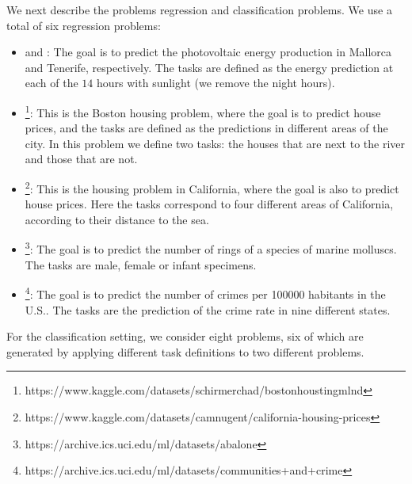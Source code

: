 We next describe the problems regression and classification problems.
We use a total of six regression problems:
\begin{itemize}
    \item {} and : The goal is to predict the photovoltaic energy production in Mallorca and Tenerife, respectively. The tasks are defined as the energy prediction at each of the $14$ hours with sunlight (we remove the night hours).
    \item {}\footnote{https://www.kaggle.com/datasets/schirmerchad/bostonhoustingmlnd}: This is the Boston housing problem, where the goal is to predict house prices, and the tasks are defined as the predictions in different areas of the city. In this problem we define two tasks: the houses that are next to the river and those that are not. 
    \item {}\footnote{https://www.kaggle.com/datasets/camnugent/california-housing-prices}: This is the housing problem in California, where the goal is also to predict house prices. Here the tasks correspond to four different areas of California, according to their distance to the sea.
    \item {}\footnote{https://archive.ics.uci.edu/ml/datasets/abalone}: The goal is to predict the number of rings of a species of marine molluscs. The tasks are male, female or infant specimens.
    \item {}\footnote{https://archive.ics.uci.edu/ml/datasets/communities+and+crime}: The goal is to predict the number of crimes per \num{100000} habitants in the U.S.. The tasks are the prediction of the crime rate in nine different states.
\end{itemize}
For the classification setting, we consider eight problems, six of which are generated by applying different task definitions to two different problems.
